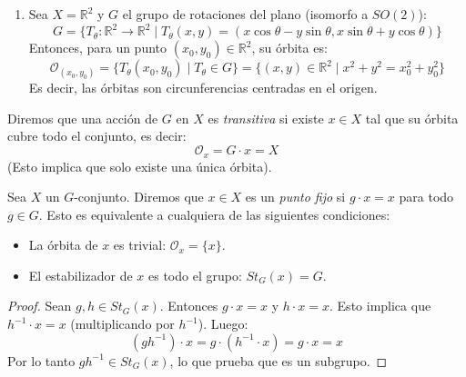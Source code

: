 \begin{eje}
\begin{enumerate}
    \item Sea $X = \mathbb{R}^2$ y $G$ el grupo de rotaciones del plano (isomorfo a $SO(2)$):
    \begin{equation*}
        G = \{T_\theta : \mathbb{R}^2 \to \mathbb{R}^2 \mid T_\theta(x,y) = (x\cos\theta - y\sin\theta, x\sin\theta + y\cos\theta)\}
    \end{equation*}
    Entonces, para un punto $(x_0, y_0) \in \mathbb{R}^2$, su órbita es:
    \begin{equation*}
        \mathcal{O}_{(x_0, y_0)} = \{T_\theta(x_0, y_0) \mid T_\theta \in G\} = \{(x,y) \in \mathbb{R}^2 \mid x^2 + y^2 = x_0^2 + y_0^2\}
    \end{equation*}
    Es decir, las órbitas son circunferencias centradas en el origen.
\end{enumerate}
\end{eje}

\begin{defi}
    Diremos que una acción de $G$ en $X$ es \textit{transitiva} si existe $x \in X$ tal que su órbita cubre todo el conjunto, es decir:
    \begin{equation*}
        \mathcal{O}_x = G \cdot x = X
    \end{equation*}
    (Esto implica que solo existe una única órbita).
\end{defi}

\begin{defi}
    Sea $X$ un $G$-conjunto. Diremos que $x \in X$ es un \textit{punto fijo} si $g \cdot x = x$ para todo $g \in G$.
    Esto es equivalente a cualquiera de las siguientes condiciones:
    \begin{itemize}
        \item La órbita de $x$ es trivial: $\mathcal{O}_x = \{x\}$.
        \item El estabilizador de $x$ es todo el grupo: $St_G(x) = G$.
    \end{itemize}
\end{defi}


\begin{proof}
    Sean $g, h \in St_G(x)$. Entonces $g \cdot x = x$ y $h \cdot x = x$.
    Esto implica que $h^{-1} \cdot x = x$ (multiplicando por $h^{-1}$).
    Luego:
    \begin{equation*}
        (gh^{-1}) \cdot x = g \cdot (h^{-1} \cdot x) = g \cdot x = x
    \end{equation*}
    Por lo tanto $gh^{-1} \in St_G(x)$, lo que prueba que es un subgrupo.
\end{proof}

